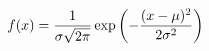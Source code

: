 \documentclass[preview]{standalone}
\begin{document}
\begin{align*}
\special{dvisvgm:raw <g id='unique000'>}f(x)=\frac{1}{\sigma\sqrt{2\pi}}\exp\left(-\frac{(x-\mu)^2}{2\sigma^2}\right)\special{dvisvgm:raw </g>}
\end{align*}
\end{document}
